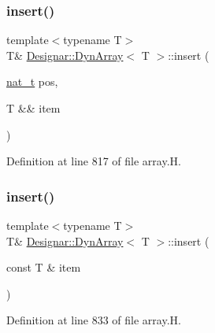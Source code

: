 \mbox{\label{class_designar_1_1_dyn_array_a919c60d5f02488027580173832af99e9}} 
\subsubsection{\texorpdfstring{insert()}{insert()}\hspace{0.1cm}{\footnotesize\ttfamily [2/4]}}
{\footnotesize\ttfamily template$<$typename T$>$ \\
T\& \hyperlink{class_designar_1_1_dyn_array}{Designar\+::\+Dyn\+Array}$<$ T $>$\+::insert (\begin{DoxyParamCaption}\item[{\hyperlink{namespace_designar_aa72662848b9f4815e7bf31a7cf3e33d1}{nat\+\_\+t}}]{pos,  }\item[{T \&\&}]{item }\end{DoxyParamCaption})\hspace{0.3cm}{\ttfamily [inline]}}



Definition at line 817 of file array.\+H.

\mbox{\label{class_designar_1_1_dyn_array_a761d20ea5068101a95e77629145099fe}} 
\subsubsection{\texorpdfstring{insert()}{insert()}\hspace{0.1cm}{\footnotesize\ttfamily [3/4]}}
{\footnotesize\ttfamily template$<$typename T$>$ \\
T\& \hyperlink{class_designar_1_1_dyn_array}{Designar\+::\+Dyn\+Array}$<$ T $>$\+::insert (\begin{DoxyParamCaption}\item[{const T \&}]{item }\end{DoxyParamCaption})\hspace{0.3cm}{\ttfamily [inline]}}



Definition at line 833 of file array.\+H.

\mbox{\label{class_designar_1_1_dyn_array_a976a619d52dcc91d531e1b95609ec971}} 
